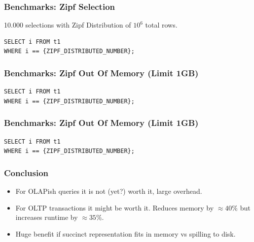 \documentclass{beamer}
\begin{document}
\begin{frame}[fragile]
    \frametitle{Benchmarks: Zipf Selection}
10.000 selections with Zipf Distribution of $10^6$ total rows.

\begin{lstlisting}[style=SQL]
SELECT i FROM t1 
WHERE i == {ZIPF_DISTRIBUTED_NUMBER};
\end{lstlisting}
    

\end{frame}

\begin{frame}[fragile]
    \frametitle{Benchmarks: Zipf Out Of Memory (Limit 1GB)}
\begin{lstlisting}[style=SQL]
SELECT i FROM t1 
WHERE i == {ZIPF_DISTRIBUTED_NUMBER};
\end{lstlisting}
    

\end{frame}


\begin{frame}[fragile]
    \frametitle{Benchmarks: Zipf Out Of Memory (Limit 1GB)}
\begin{lstlisting}[style=SQL]
SELECT i FROM t1 
WHERE i == {ZIPF_DISTRIBUTED_NUMBER};
\end{lstlisting}
    

\end{frame}


\begin{frame}
    \frametitle{Conclusion}

    \begin{itemize}
        \item For OLAPish queries it is not (yet?) worth it, large overhead.
        \item For OLTP transactions it might be worth it. Reduces memory by $\approx 40\%$ but increases runtime by $\approx 35\%$.
        \item Huge benefit if succinct representation fits in memory vs spilling to disk.
    \end{itemize}
\end{frame}
\end{document}
